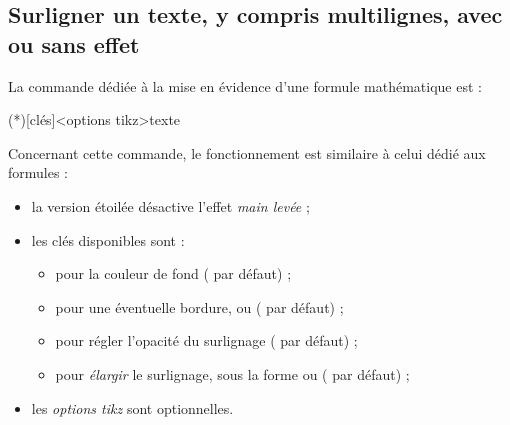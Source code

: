 \documentclass[french,11pt,a4paper]{article}
\begin{document}

\pagebreak

\subsection{Surligner un texte, y compris multilignes, avec  ou sans effet}

La commande dédiée à la mise en évidence d'une formule mathématique est  :

\begin{codehigh}[language=latex/latex2,style/main=cyan!10,style/code=cyan!10]
\SurlignerTexte(*)[clés]<options tikz>{texte}
\end{codehigh}

Concernant cette commande, le fonctionnement est similaire à celui dédié aux formules :

\begin{itemize}
	\item la version étoilée désactive l'effet \textit{main levée} ;
	\item les clés disponibles sont :
	\begin{itemize}
		\item {} pour la couleur de fond ( par défaut) ;
		\item {} pour une éventuelle bordure,  ou  ( par défaut) ;
		\item {} pour régler l'opacité du surlignage ( par défaut) ;
		\item {} pour \textit{élargir} le surlignage, sous la forme  ou  (\MontreCode{1pt} par défaut) ;
	\end{itemize}
	\item les \textit{options tikz} sont optionnelles.
\end{itemize}
\end{document}
